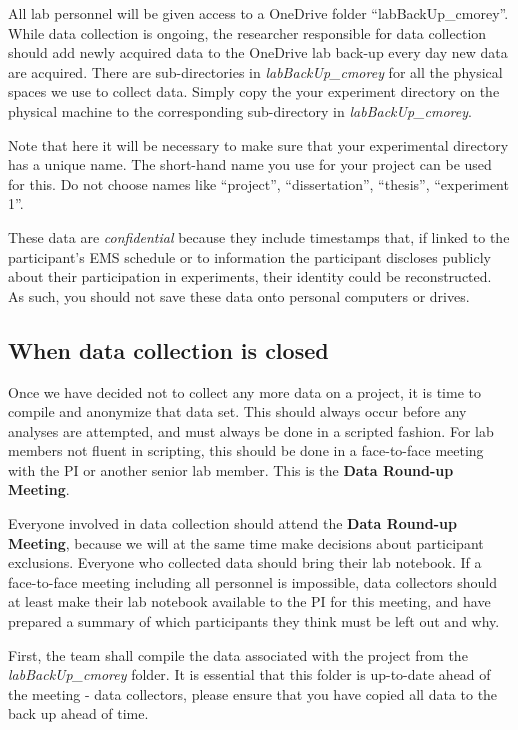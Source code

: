 \documentclass[12pt,]{book}
\theoremstyle{definition}
\theoremstyle{definition}
\theoremstyle{definition}
\theoremstyle{remark}
\begin{document}
All lab personnel will be given access to a OneDrive folder
``labBackUp\_cmorey''. While data collection is ongoing, the researcher
responsible for data collection should add newly acquired data to the
OneDrive lab back-up every day new data are acquired. There are
sub-directories in \emph{labBackUp\_cmorey} for all the physical spaces
we use to collect data. Simply copy the your experiment directory on the
physical machine to the corresponding sub-directory in
\emph{labBackUp\_cmorey}.

Note that here it will be necessary to make sure that your experimental
directory has a unique name. The short-hand name you use for your
project can be used for this. Do not choose names like ``project'',
``dissertation'', ``thesis'', ``experiment 1''.

These data are \emph{confidential} because they include timestamps that,
if linked to the participant's EMS schedule or to information the
participant discloses publicly about their participation in experiments,
their identity could be reconstructed. As such, you should not save
these data onto personal computers or drives.

\subsection{When data collection is
closed}\label{when-data-collection-is-closed}

Once we have decided not to collect any more data on a project, it is
time to compile and anonymize that data set. This should always occur
before any analyses are attempted, and must always be done in a scripted
fashion. For lab members not fluent in scripting, this should be done in
a face-to-face meeting with the PI or another senior lab member. This is
the \textbf{Data Round-up Meeting}.

Everyone involved in data collection should attend the \textbf{Data
Round-up Meeting}, because we will at the same time make decisions about
participant exclusions. Everyone who collected data should bring their
lab notebook. If a face-to-face meeting including all personnel is
impossible, data collectors should at least make their lab notebook
available to the PI for this meeting, and have prepared a summary of
which participants they think must be left out and why.

First, the team shall compile the data associated with the project from
the \emph{labBackUp\_cmorey} folder. It is essential that this folder is
up-to-date ahead of the meeting - data collectors, please ensure that
you have copied all data to the back up ahead of time.
\end{document}

